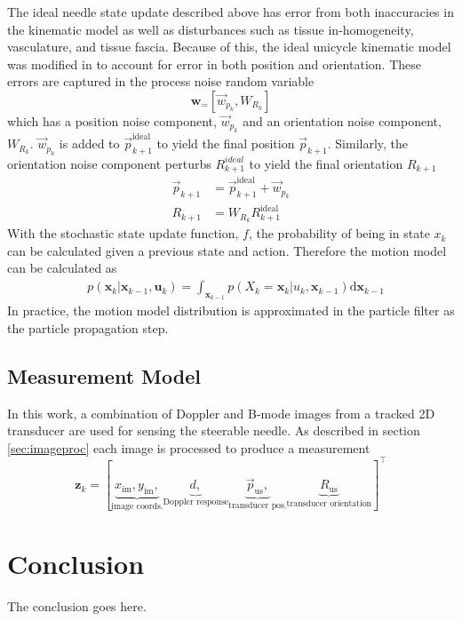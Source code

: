 \documentclass[journal,transmag]{IEEEtran}
\newcommand{\bvar}[2]{\mathbf{#1}_{#2}}
\begin{document}
The ideal needle state update described above has error from both inaccuracies in the kinematic model as well as disturbances such as tissue in-homogeneity, vasculature, and tissue fascia.  Because of this, the ideal unicycle kinematic model was modified in \cite{adebar2014recursive} to account for error in both position and orientation.  These errors are captured in the process noise random variable 
\begin{equation*}
\bvar{w} = \left[\vec{w}_{p_k}, W_{R_k}\right]
\end{equation*}  
which has a position noise component, $\vec{w}_{p_k}$ and an orientation noise component, $W_{R_k}$.  $\vec{w}_{p_k}$ is added to $\vec{p}^{\text{ideal}}_{k+1}$ to yield the final position $\vec{p}_{k+1}$.
Similarly, the orientation noise component perturbs $R^{ideal}_{k+1}$ to yield the final orientation $R_{k+1}$
\begin{align*}
\vec{p}_{k+1} &= \vec{p}^{\text{ideal}}_{k+1}+\vec{w}_{p_k} \\
R_{k+1} &= W_{R_k}R^{\text{ideal}}_{k+1}
\end{align*}
With the stochastic state update function, $f$, the probability of being in state $x_k$ can be calculated given a previous state and action.  Therefore the motion model can be calculated as 
\begin{align*}
& p(\bvar{x}{k}|\bvar{x}{k-1},\bvar{u}{k}) = \int_{\bvar{x}{k-1}} p(X_k = \bvar{x}{k} | u_k, \bvar{x}{k-1}) \mathrm{d}\bvar{x}{k-1}
\end{align*}
In practice, the motion model distribution is approximated in the particle filter as the particle propagation step.
\subsection{Measurement Model} \label{subsec:measurement}
In this work, a combination of Doppler and B-mode images from a tracked 2D transducer are used for sensing the steerable needle.  As described in section \ref{sec:imageproc} each image is processed to produce a measurement
\begin{dmath*}
\bvar{z}{k} = \left[\underbrace{x_{\text{im}},y_{\text{im}},}_{\text{image coords.}} \underbrace{d,}_{\text{Doppler response}} \underbrace{\vec{p}_{\text{us}},}_{\text{transducer pos.}} \underbrace{R_{\text{us}}}_{\text{transducer orientation}}\right]^\top
\end{dmath*}

 
\section{Conclusion}
The conclusion goes here.
\end{document}
